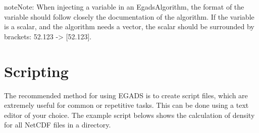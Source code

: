\documentclass[a4paper,10pt,openany,english]{sphinxmanual}
\begin{document}
\begin{sphinxadmonition}{note}{Note:}
When injecting a variable in an EgadsAlgorithm, the format of the variable should follow closely the documentation of the algorithm. If the variable is a scalar, and the algorithm needs a vector, the scalar should be surrounded by brackets: 52.123 -\textgreater{} {[}52.123{]}.
\end{sphinxadmonition}
\newpage

\section{Scripting}
\label{tutorial:scripting}
The recommended method for using EGADS is to create script files, which are extremely useful for common or repetitive tasks. This can be done using a text editor of your choice. The example script belows shows the calculation of density for all NetCDF files in a directory.
\end{document}

